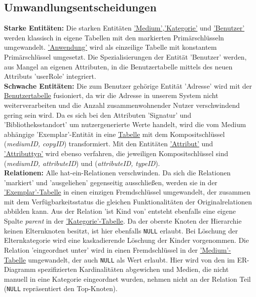 \documentclass{article}
\begin{document}
\subsection{Umwandlungsentscheidungen}
\textbf{Starke Entitäten:} Die starken Entitäten \hyperlink{Medium}{'Medium'},\hyperlink{Category}{'Kategorie'} und \hyperlink{User}{'Benutzer'} werden klassisch in eigene Tabellen mit den markierten Primärschlüsseln umgewandelt. \hyperlink{Application}{'Anwendung'} wird als einzeilige Tabelle mit konstantem Primärschlüssel umgesetzt. Die Spezialisierungen der Entität 'Benutzer' werden, aus Mangel an eigenen Attributen, in die Benutzertabelle mittels des neuen Attributs 'userRole' integriert. \\
\textbf{Schwache Entitäten:} Die zum Benutzer gehörige Entität 'Adresse' wird mit der \hyperlink{User}{Benutzertabelle} fusioniert, da wir die Adresse in unserem System nicht weiterverarbeiten und die Anzahl zusammenwohnender Nutzer verschwindend gering sein wird. Da es sich bei den Attributen 'Signatur' und 'Bibliotheksstandort' um nutzergenerierte Werte handelt, wird die vom Medium abhängige 'Exemplar'-Entität in eine \hyperlink{Copy}{Tabelle} mit dem Kompositschlüssel (\textit{mediumID, copyID}) transformiert. Mit den Entitäten \hyperlink{CustomAttribute}{'Attribut'} und \hyperlink{AttributeType}{'Attributtyp'} wird ebenso verfahren, die jeweiligen Kompositschlüssel sind (\textit{mediumID, attributeID}) und (\textit{attributeID, typeID}). \\
\textbf{Relationen:} Alle hat-ein-Relationen verschwinden. Da sich die Relationen 'markiert' und 'ausgeliehen' gegenseitig ausschließen, werden sie in der \hyperlink{Copy}{'Exemplar'-Tabelle} in einen einzigen Fremdschlüssel umgewandelt, der zusammen mit dem Verfügbarkeitsstatus die gleichen Funktionalitäten der Originalrelationen abbilden kann. Aus der Relation 'ist Kind von' entsteht ebenfalls eine eigene Spalte \textit{parent} in der \hyperlink{Category}{'Kategorie'-Tabelle}. Da der oberste Knoten der Hierarchie keinen Elternknoten besitzt, ist hier ebenfalls \texttt{NULL} erlaubt. Bei Löschung der Elternkategorie wird eine kaskadierende Löschung der Kinder vorgenommen. Die Relation 'eingeordnet unter' wird in einen Fremdschlüssel in der \hyperlink{Medium}{'Medium'-Tabelle} umgewandelt, der auch \texttt{NULL} als Wert erlaubt. Hier wird von den im ER-Diagramm spezifizierten Kardinalitäten abgewichen und Medien, die nicht manuell in eine Kategorie eingeordnet wurden, nehmen nicht an der Relation Teil (\texttt{NULL} repräsentiert den Top-Knoten). \\
\end{document}
